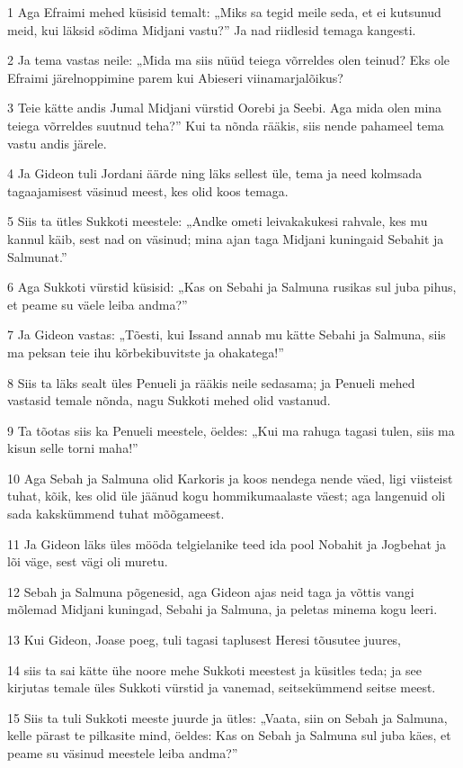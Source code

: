 \par 1 Aga Efraimi mehed küsisid temalt: „Miks sa tegid meile seda, et ei kutsunud meid, kui läksid sõdima Midjani vastu?” Ja nad riidlesid temaga kangesti.
\par 2 Ja tema vastas neile: „Mida ma siis nüüd teiega võrreldes olen teinud? Eks ole Efraimi järelnoppimine parem kui Abieseri viinamarjalõikus?
\par 3 Teie kätte andis Jumal Midjani vürstid Oorebi ja Seebi. Aga mida olen mina teiega võrreldes suutnud teha?” Kui ta nõnda rääkis, siis nende pahameel tema vastu andis järele.
\par 4 Ja Gideon tuli Jordani äärde ning läks sellest üle, tema ja need kolmsada tagaajamisest väsinud meest, kes olid koos temaga.
\par 5 Siis ta ütles Sukkoti meestele: „Andke ometi leivakakukesi rahvale, kes mu kannul käib, sest nad on väsinud; mina ajan taga Midjani kuningaid Sebahit ja Salmunat.”
\par 6 Aga Sukkoti vürstid küsisid: „Kas on Sebahi ja Salmuna rusikas sul juba pihus, et peame su väele leiba andma?”
\par 7 Ja Gideon vastas: „Tõesti, kui Issand annab mu kätte Sebahi ja Salmuna, siis ma peksan teie ihu kõrbekibuvitste ja ohakatega!”
\par 8 Siis ta läks sealt üles Penueli ja rääkis neile sedasama; ja Penueli mehed vastasid temale nõnda, nagu Sukkoti mehed olid vastanud.
\par 9 Ta tõotas siis ka Penueli meestele, öeldes: „Kui ma rahuga tagasi tulen, siis ma kisun selle torni maha!”
\par 10 Aga Sebah ja Salmuna olid Karkoris ja koos nendega nende väed, ligi viisteist tuhat, kõik, kes olid üle jäänud kogu hommikumaalaste väest; aga langenuid oli sada kakskümmend tuhat mõõgameest.
\par 11 Ja Gideon läks üles mööda telgielanike teed ida pool Nobahit ja Jogbehat ja lõi väge, sest vägi oli muretu.
\par 12 Sebah ja Salmuna põgenesid, aga Gideon ajas neid taga ja võttis vangi mõlemad Midjani kuningad, Sebahi ja Salmuna, ja peletas minema kogu leeri.
\par 13 Kui Gideon, Joase poeg, tuli tagasi taplusest Heresi tõusutee juures,
\par 14 siis ta sai kätte ühe noore mehe Sukkoti meestest ja küsitles teda; ja see kirjutas temale üles Sukkoti vürstid ja vanemad, seitsekümmend seitse meest.
\par 15 Siis ta tuli Sukkoti meeste juurde ja ütles: „Vaata, siin on Sebah ja Salmuna, kelle pärast te pilkasite mind, öeldes: Kas on Sebah ja Salmuna sul juba käes, et peame su väsinud meestele leiba andma?”
